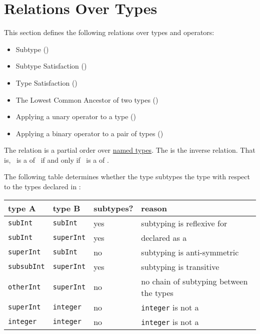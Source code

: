 \section{Relations Over Types\label{sec:RelationsOnTypes}}

This section defines the following relations over types and operators:
\begin{itemize}
  \item Subtype ()
  \item Subtype Satisfaction ()
  \item Type Satisfaction ()
  \item The Lowest Common Ancestor of two types ()
  \item Applying a unary operator to a type ()
  \item Applying a binary operator to a pair of types ()
\end{itemize}

\hypertarget{def-supertypeterm}{}
The \emph{\subtypeterm} relation is a partial order over \underline{named types}.
The \emph{\supertypeterm} is the inverse relation.
That is, \tty\ is a \supertypeterm{} of \tsy\ if and only if \tsy\ is a \subtypeterm{} of \tty.

The following table determines whether the type \vAbf{}
subtypes the type \vBbf{} with respect to the types
declared in :\\
\begin{tabular}{llll}
  \textbf{type A} & \textbf{type B}   & \textbf{subtypes?}  & \textbf{reason}\\
\hline
  \texttt{subInt}     & \texttt{subInt}   & yes             & subtyping is reflexive for \namedtypesterm{}\\
  \texttt{subInt}     & \texttt{superInt} & yes             & declared as a \subtypeterm{}\\
  \texttt{superInt}   & \texttt{subInt}   & no              & subtyping is anti-symmetric\\
  \texttt{subsubInt}  & \texttt{superInt} & yes             & subtyping is transitive\\
  \texttt{otherInt}   & \texttt{superInt} & no              & no chain of subtyping between the types\\
  \texttt{superInt}   & \texttt{integer}  & no              & \texttt{integer} is not a \namedtypeterm{}\\
  \texttt{integer}    & \texttt{integer}  & no              & \texttt{integer} is not a \namedtypeterm{}\\
\end{tabular}

